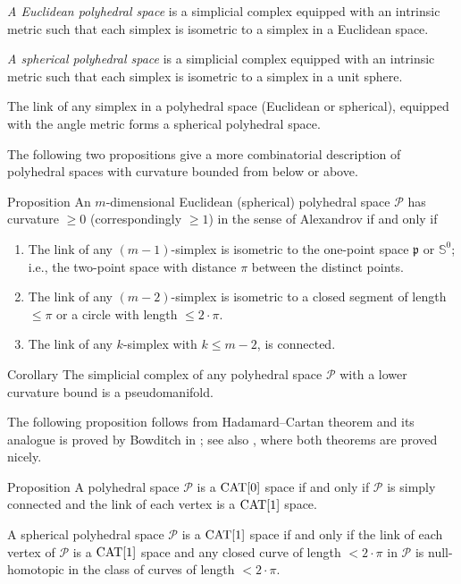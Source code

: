 \documentclass[oneside,a4paper]{article}
\def\SS{\mathbb{S}}
\begin{document}
\emph{A Euclidean polyhedral space} is a simplicial complex equipped with an intrinsic metric such that each simplex is isometric to a simplex in a Euclidean space.

\emph{A spherical polyhedral space} is a simplicial complex equipped with an intrinsic metric such that each simplex is isometric to a simplex in a unit sphere.

The link of any simplex in a polyhedral space
(Euclidean or spherical),
equipped with the angle metric forms a spherical polyhedral space.

The following two propositions give a more combinatorial description of polyhedral spaces with curvature bounded from below or above.

\begin{thm}{Proposition}\label{prop:poly-cbb}
An $m$-dimensional Euclidean (spherical) polyhedral space $\mathcal{P}$
has curvature $\ge 0$ (correspondingly $\ge 1$)
in the sense of Alexandrov
if and only if
\begin{enumerate}
\item The link of any $(m-1)$-simplex is isometric to the one-point space $\mathfrak{p}$ or $\SS^0$; i.e., the two-point space with distance $\pi$ between the distinct points.
\item The link of any $(m-2)$-simplex is isometric to a closed segment of length $\le \pi$ or a circle with length $\le2\cdot\pi$.
\item The link of any $k$-simplex with $k\le m-2$, is connected.
\end{enumerate}

\end{thm}

\begin{thm}{Corollary}
The simplicial complex of any polyhedral space $\mathcal{P}$ with a lower curvature bound is a pseudomanifold.
\end{thm}

The following proposition
follows from Hadamard--Cartan theorem
and its analogue is proved by Bowditch in \cite{bowditch};
see also \cite{akp}, where both theorems are proved nicely.

\begin{thm}{Proposition}\label{prop:poly-cba}
A  polyhedral space $\mathcal{P}$ is a $\mathrm{CAT}[0]$ space
if and only if $\mathcal{P}$ is simply connected
and the link of each vertex is a $\mathrm{CAT}[1]$ space.

A spherical polyhedral space $\mathcal{P}$
is a $\mathrm{CAT}[1]$ space
if and only if  the link of each vertex of $\mathcal{P}$ is a $\mathrm{CAT}[1]$ space
and any closed curve of length $<2\cdot\pi$ in $\mathcal{P}$ is null-homotopic in the class of curves of length $<2\cdot\pi$.
\end{thm}
\end{document}
